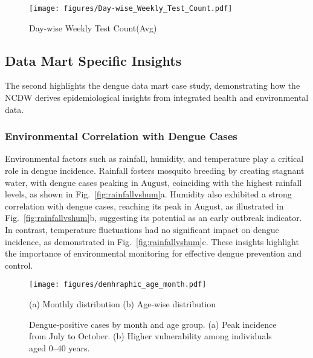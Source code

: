 \begin{figure}
\vspace{-4mm}
    \centering
    \texttt{[image: figures/Day-wise\_Weekly\_Test\_Count.pdf]}
    \caption{Day-wise Weekly Test Count(Avg)}
    \label{fig:day_wise_weekly_test}
    \vspace{-6.5mm}
\end{figure}


\subsection{ Data  Mart Specific Insights}
The second highlights the dengue data mart case study, demonstrating how the NCDW derives epidemiological insights from integrated health and environmental data.

\subsubsection{Environmental Correlation with Dengue Cases}
Environmental factors such as rainfall, humidity, and temperature play a critical role in dengue incidence. Rainfall fosters mosquito breeding by creating stagnant water, with dengue cases peaking in August, coinciding with the highest rainfall levels, as shown in Fig.~\ref{fig:rainfallvshum}a. Humidity also exhibited a strong correlation with dengue cases, reaching its peak in August, as illustrated in Fig.~\ref{fig:rainfallvshum}b, suggesting its potential as an early outbreak indicator. In contrast, temperature fluctuations had no significant impact on dengue incidence, as demonstrated in Fig.~\ref{fig:rainfallvshum}c. These insights highlight the importance of environmental monitoring for effective dengue prevention and control.

































\begin{figure}[!h]
    \centering
    \texttt{[image: figures/demhraphic\_age\_month.pdf]}
    \begin{center}
     (a) Monthly distribution \hspace{1cm}  (b) Age-wise distribution
    \end{center}
    \caption{Dengue-positive cases by month and age group. (a) Peak incidence from July to October. (b) Higher vulnerability among individuals aged 0–40 years.}

    \label{fig:demographic}
\end{figure}

